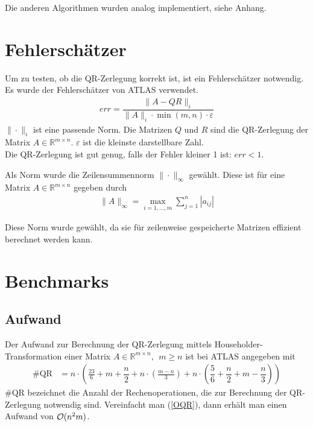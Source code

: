 Die anderen Algorithmen wurden analog implementiert, siehe Anhang.

\section{Fehlerschätzer} \label{Fehlerschätzer}

Um zu testen, ob die QR-Zerlegung korrekt ist, ist ein Fehlerschätzer notwendig.
Es wurde der Fehlerschätzer von ATLAS \cite{atlas} verwendet.
\begin{align}
err = \dfrac{\|A - QR\|_i}{\|A\|_i \cdot \min(m,n) \cdot \varepsilon}
\end{align}
$\|\cdot\|_i$ ist eine passende Norm.
Die Matrizen $Q$ und $R$ sind die QR-Zerlegung der Matrix $A \in \mathbb{R}^{m \times n}$.
$\varepsilon$ ist die kleinste darstellbare Zahl.\\
Die QR-Zerlegung ist gut genug, falls der Fehler kleiner 1 ist: $ err < 1 $.

Als Norm wurde die Zeilensummennorm $\|\cdot\|_\infty$ gewählt.
Diese ist für eine Matrix $A \in \mathbb{R}^{m\times n}$ gegeben durch
\begin{align*}
\|A\|_\infty = \max_{i=1,...,m} \sum_{j=1}^{n} |a_{ij}|
\end{align*}

Diese Norm wurde gewählt, da sie für zeilenweise gespeicherte Matrizen effizient berechnet werden kann.

\section{Benchmarks}

\subsection{Aufwand} \label{aufwand}

Der Aufwand zur Berechnung der QR-Zerlegung mittels Householder-Transformation einer Matrix $A \in \mathbb{R}^{m \times n},~~ m \ge n$ ist bei ATLAS \cite{atlas} angegeben mit
\begin{align}
\#\text{QR} &= n \cdot \left(\frac{23}{6} + m + \dfrac{n}{2} + n\cdot \left(\frac{m-n}{3} \right) + n\cdot \left(\dfrac{5}{6} + \dfrac{n}{2} + m - \dfrac{n}{3}\right)\right) %
\label{OQR}
\end{align}
$\#\text{QR}$ bezeichnet die Anzahl der Rechenoperationen, die zur Berechnung der QR-Zerlegung notwendig sind. 
Vereinfacht man (\ref{OQR}), dann erhält man einen Aufwand von $ {\cal O}(n^2m)$.

